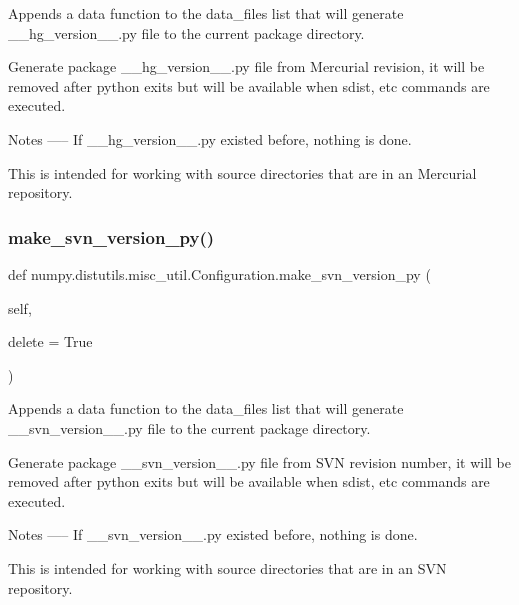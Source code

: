 \begin{DoxyVerb}Appends a data function to the data_files list that will generate
__hg_version__.py file to the current package directory.

Generate package __hg_version__.py file from Mercurial revision,
it will be removed after python exits but will be available
when sdist, etc commands are executed.

Notes
-----
If __hg_version__.py existed before, nothing is done.

This is intended for working with source directories that are
in an Mercurial repository.
\end{DoxyVerb}
 \mbox{\label{classnumpy_1_1distutils_1_1misc__util_1_1Configuration_affb728d6e6998bce8c606dc52ea75e66}} 
\subsubsection{\texorpdfstring{make\+\_\+svn\+\_\+version\+\_\+py()}{make\_svn\_version\_py()}}
{\footnotesize\ttfamily def numpy.\+distutils.\+misc\+\_\+util.\+Configuration.\+make\+\_\+svn\+\_\+version\+\_\+py (\begin{DoxyParamCaption}\item[{}]{self,  }\item[{}]{delete = {\ttfamily True} }\end{DoxyParamCaption})}

\begin{DoxyVerb}Appends a data function to the data_files list that will generate
__svn_version__.py file to the current package directory.

Generate package __svn_version__.py file from SVN revision number,
it will be removed after python exits but will be available
when sdist, etc commands are executed.

Notes
-----
If __svn_version__.py existed before, nothing is done.

This is
intended for working with source directories that are in an SVN
repository.
\end{DoxyVerb}
 \mbox{\label{classnumpy_1_1distutils_1_1misc__util_1_1Configuration_a12121f45ce6ea3add0e88e248db3b58c}} 
